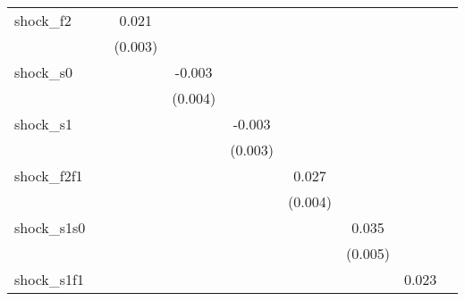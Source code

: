 {\begin{tabular}{l*{8}{c}}
\addlinespace
shock\_f2    &                     &       0.021\sym{***}&                     &                     &                     &                     &                     &                     \\
            &                     &     (0.003)         &                     &                     &                     &                     &                     &                     \\
\addlinespace
shock\_s0    &                     &                     &      -0.003         &                     &                     &                     &                     &                     \\
            &                     &                     &     (0.004)         &                     &                     &                     &                     &                     \\
\addlinespace
shock\_s1    &                     &                     &                     &      -0.003         &                     &                     &                     &                     \\
            &                     &                     &                     &     (0.003)         &                     &                     &                     &                     \\
\addlinespace
shock\_f2f1  &                     &                     &                     &                     &       0.027\sym{***}&                     &                     &                     \\
            &                     &                     &                     &                     &     (0.004)         &                     &                     &                     \\
\addlinespace
shock\_s1s0  &                     &                     &                     &                     &                     &       0.035\sym{***}&                     &                     \\
            &                     &                     &                     &                     &                     &     (0.005)         &                     &                     \\
\addlinespace
shock\_s1f1  &                     &                     &                     &                     &                     &                     &       0.023\sym{***}&                     \\

\end{tabular}}
